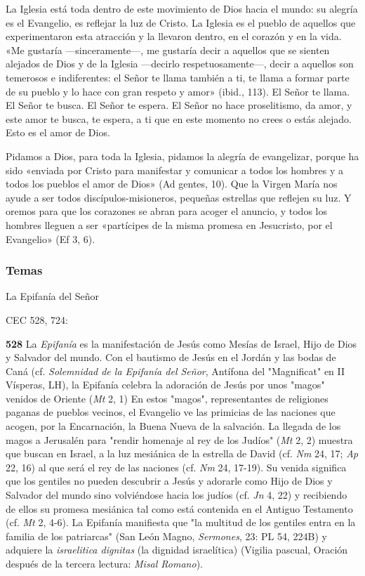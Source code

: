 \documentclass[]{article}
\begin{document}
La Iglesia está toda dentro de este movimiento de Dios hacia el mundo:
su alegría es el Evangelio, es reflejar la luz de Cristo. La Iglesia es
el pueblo de aquellos que experimentaron esta atracción y la llevaron
dentro, en el corazón y en la vida. «Me gustaría ---sinceramente---, me
gustaría decir a aquellos que se sienten alejados de Dios y de la
Iglesia ---decirlo respetuosamente---, decir a aquellos son temerosos e
indiferentes: el Señor te llama también a ti, te llama a formar parte de
su pueblo y lo hace con gran respeto y amor» (ibid., 113). El Señor te
llama. El Señor te busca. El Señor te espera. El Señor no hace
proselitismo, da amor, y este amor te busca, te espera, a ti que en este
momento no crees o estás alejado. Esto es el amor de Dios.

Pidamos a Dios, para toda la Iglesia, pidamos la alegría de evangelizar,
porque ha sido «enviada por Cristo para manifestar y comunicar a todos
los hombres y a todos los pueblos el amor de Dios» (Ad gentes, 10). Que
la Virgen María nos ayude a ser todos discípulos-misioneros, pequeñas
estrellas que reflejen su luz. Y oremos para que los corazones se abran
para acoger el anuncio, y todos los hombres lleguen a ser «partícipes de
la misma promesa en Jesucristo, por el Evangelio» (Ef 3, 6).

\protect\hypertarget{_Ref448599075}{}{\protect\hypertarget{_Toc448662875}{}{\protect\hypertarget{_Toc448690394}{}{}}}

\subsubsection{Temas}\label{temas-11}

La Epifanía del Señor

CEC 528, 724:

\textbf{528} La \emph{Epifanía} es la manifestación de Jesús como Mesías
de Israel, Hijo de Dios y Salvador del mundo. Con el bautismo de Jesús
en el Jordán y las bodas de Caná (cf. \emph{Solemnidad de la Epifanía
del Señor}, Antífona del "Magnificat" en II Vísperas, LH), la Epifanía
celebra la adoración de Jesús por unos "magos" venidos de Oriente
(\emph{Mt} 2, 1) En estos "magos", representantes de religiones paganas
de pueblos vecinos, el Evangelio ve las primicias de las naciones que
acogen, por la Encarnación, la Buena Nueva de la salvación. La llegada
de los magos a Jerusalén para "rendir homenaje al rey de los Judíos"
(\emph{Mt} 2, 2) muestra que buscan en Israel, a la luz mesiánica de la
estrella de David (cf. \emph{Nm} 24, 17; \emph{Ap} 22, 16) al que será
el rey de las naciones (cf. \emph{Nm} 24, 17-19). Su venida significa
que los gentiles no pueden descubrir a Jesús y adorarle como Hijo de
Dios y Salvador del mundo sino volviéndose hacia los judíos (cf.
\emph{Jn} 4, 22) y recibiendo de ellos su promesa mesiánica tal como
está contenida en el Antiguo Testamento (cf. \emph{Mt} 2, 4-6). La
Epifanía manifiesta que "la multitud de los gentiles entra en la familia
de los patriarcas" (San León Magno, \emph{Sermones}, 23: PL 54, 224B) y
adquiere la \emph{israelitica dignitas} (la dignidad israelítica)
(Vigilia pascual, Oración después de la tercera lectura: \emph{Misal
Romano}).
\end{document}
